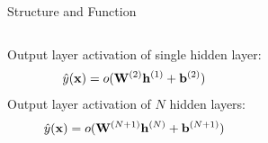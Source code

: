\begin{frame}[t]{Structure and Function}
\begin{columns}[T]
{
		    }
	  \end{columns}\vspace{5mm}
	  \begin{columns}[T]
	   \column{3in}
		Output layer activation of single hidden layer:
		 \begin{align} 
		 \hat{y}(\mathbf{x}) = o(\mathbf{W}^{(2)}\mathbf{h}^{(1)} + \mathbf{b}^{(2)} )\nonumber
		 \end{align}
		 Output layer activation of $N$ hidden layers:
		 \begin{align} 
		 \hat{y}(\mathbf{x}) = o(\mathbf{W}^{(N+1)}\mathbf{h}^{(N)} + \mathbf{b}^{(N+1)} )\nonumber
		 \end{align}
	    \column{1.5in}
	  \end{columns}

	  

	\end{frame}
	
